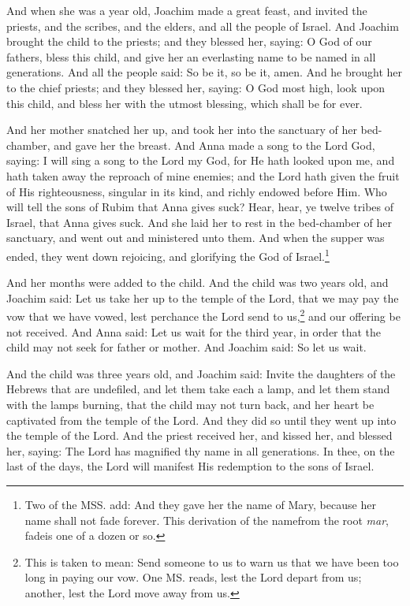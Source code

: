 \pend\pstart
And when she was a year old, Joachim made a great feast, and invited the priests, and the scribes, and the elders, and all the people of Israel. And Joachim brought the child to the priests; and they blessed her, saying: O God of our fathers, bless this child, and give her an everlasting name to be named in all generations. And all the people said: So be it, so be it, amen. And he brought her to the chief priests; and they blessed her, saying: O God most high, look upon this child, and bless her with the utmost blessing, which shall be for ever.

\pend\pstart
And her mother snatched her up, and took her into the sanctuary of her bed-chamber, and gave her the breast. And Anna made a song to the Lord God, saying: I will sing a song to the Lord my God, for He hath looked upon me, and hath taken away the reproach of mine enemies; and the Lord hath given the fruit of His righteousness, singular in its kind, and richly endowed before Him. Who will tell the sons of Rubim that Anna gives suck? Hear, hear, ye twelve tribes of Israel, that Anna gives suck. And she laid her to rest in the bed-chamber of her sanctuary, and went out and ministered unto them. And when the supper was ended, they went down rejoicing, and glorifying the God of Israel.\footnote{Two of the MSS. add: And they gave her the name of Mary, because her name shall not fade forever. This derivation of the name\textemdash from the root \textit{mar}, fade\textemdash is one of a dozen or so.}

\pend\pstart
{}

\pend\pstart
And her months were added to the child. And the child was two years old, and Joachim said: Let us take her up to the temple of the Lord, that we may pay the vow that we have vowed, lest perchance the Lord send to us,\footnote{This is taken to mean: Send someone to us to warn us that we have been too long in paying our vow. One MS. reads, lest the Lord depart from us; another, lest the Lord move away from us.} and our offering be not received. And Anna said: Let us wait for the third year, in order that the child may not seek for father or mother. And Joachim said: So let us wait.

\pend\pstart
And the child was three years old, and Joachim said: Invite the daughters of the Hebrews that are undefiled, and let them take each a lamp, and let them stand with the lamps burning, that the child may not turn back, and her heart be captivated from the temple of the Lord. And they did so until they went up into the temple of the Lord. And the priest received her, and kissed her, and blessed her, saying: The Lord has magnified thy name in all generations. In thee, on the last of the days, the Lord will manifest His redemption to the sons of Israel.

